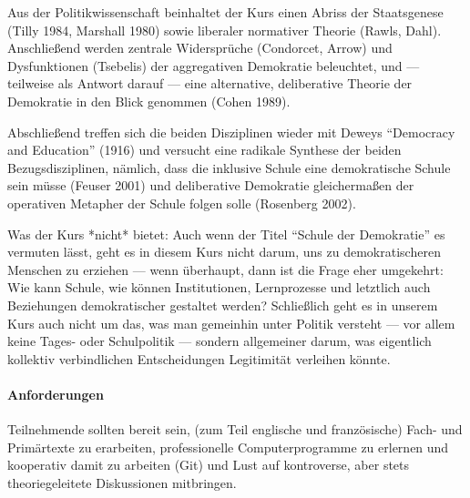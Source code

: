 Aus der Politikwissenschaft beinhaltet der Kurs einen Abriss der Staatsgenese (Tilly 1984, Marshall 1980) sowie liberaler normativer Theorie (Rawls, Dahl).
Anschließend werden zentrale Widersprüche (Condorcet, Arrow) und Dysfunktionen (Tsebelis) der aggregativen Demokratie beleuchtet, und --- teilweise als Antwort darauf --- eine alternative, deliberative Theorie der Demokratie in den Blick genommen (Cohen 1989).

Abschließend treffen sich die beiden Disziplinen wieder mit Deweys ``Democracy and Education'' (1916) und versucht eine radikale Synthese der beiden Bezugsdisziplinen, nämlich, dass die inklusive Schule eine demokratische Schule sein müsse (Feuser 2001) und deliberative Demokratie gleichermaßen der operativen Metapher der Schule folgen solle (Rosenberg 2002).

Was der Kurs *nicht* bietet:
Auch wenn der Titel ``Schule der Demokratie'' es vermuten lässt, geht es in diesem Kurs nicht darum, uns zu demokratischeren Menschen zu erziehen --- wenn überhaupt, dann ist die Frage eher umgekehrt:
Wie kann Schule, wie können Institutionen, Lernprozesse und letztlich auch Beziehungen demokratischer gestaltet werden? Schließlich geht es in unserem Kurs auch nicht um das, was man gemeinhin unter Politik versteht --- vor allem keine Tages- oder Schulpolitik --- sondern allgemeiner darum, was eigentlich kollektiv verbindlichen Entscheidungen Legitimität verleihen könnte.


\paragraph{Anforderungen}

Teilnehmende sollten bereit sein, (zum Teil englische und französische) Fach- und Primärtexte zu erarbeiten, professionelle Computerprogramme zu erlernen und kooperativ damit zu arbeiten (Git) und Lust auf kontroverse, aber stets theoriegeleitete Diskussionen mitbringen.

